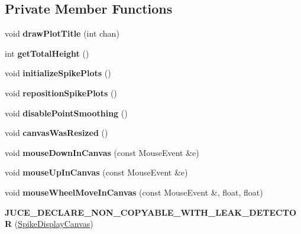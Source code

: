 \subsection*{Private Member Functions}
\begin{DoxyCompactItemize}
\item 
\hypertarget{classSpikeDisplayCanvas_a3f76b2964975da294b23d022eb14f66c}{void {\bfseries draw\-Plot\-Title} (int chan)}\label{classSpikeDisplayCanvas_a3f76b2964975da294b23d022eb14f66c}

\item 
\hypertarget{classSpikeDisplayCanvas_a2c1380483afcb1a4d7f024945b038530}{int {\bfseries get\-Total\-Height} ()}\label{classSpikeDisplayCanvas_a2c1380483afcb1a4d7f024945b038530}

\item 
\hypertarget{classSpikeDisplayCanvas_a8933f0eced1508de89c63eb488f84b0c}{void {\bfseries initialize\-Spike\-Plots} ()}\label{classSpikeDisplayCanvas_a8933f0eced1508de89c63eb488f84b0c}

\item 
\hypertarget{classSpikeDisplayCanvas_a8d17a50458d16fa018db53a8ceae0f6c}{void {\bfseries reposition\-Spike\-Plots} ()}\label{classSpikeDisplayCanvas_a8d17a50458d16fa018db53a8ceae0f6c}

\item 
\hypertarget{classSpikeDisplayCanvas_ad35880491504d7bdb4c9c5ede90c1b54}{void {\bfseries disable\-Point\-Smoothing} ()}\label{classSpikeDisplayCanvas_ad35880491504d7bdb4c9c5ede90c1b54}

\item 
\hypertarget{classSpikeDisplayCanvas_acbae1c32b6f4b052a07e3000c2a3c4cf}{void {\bfseries canvas\-Was\-Resized} ()}\label{classSpikeDisplayCanvas_acbae1c32b6f4b052a07e3000c2a3c4cf}

\item 
\hypertarget{classSpikeDisplayCanvas_a270ac99c4cfc87ae1a3789e0a4a8089c}{void {\bfseries mouse\-Down\-In\-Canvas} (const Mouse\-Event \&e)}\label{classSpikeDisplayCanvas_a270ac99c4cfc87ae1a3789e0a4a8089c}

\item 
\hypertarget{classSpikeDisplayCanvas_abd36f6c6cd235882722fbae0acea21a8}{void {\bfseries mouse\-Up\-In\-Canvas} (const Mouse\-Event \&e)}\label{classSpikeDisplayCanvas_abd36f6c6cd235882722fbae0acea21a8}

\item 
\hypertarget{classSpikeDisplayCanvas_a01d354fbb21089779160e5b4bb0754e6}{void {\bfseries mouse\-Wheel\-Move\-In\-Canvas} (const Mouse\-Event \&, float, float)}\label{classSpikeDisplayCanvas_a01d354fbb21089779160e5b4bb0754e6}

\item 
\hypertarget{classSpikeDisplayCanvas_adae6fbac8cef7b6506d2208a72c0110a}{{\bfseries J\-U\-C\-E\-\_\-\-D\-E\-C\-L\-A\-R\-E\-\_\-\-N\-O\-N\-\_\-\-C\-O\-P\-Y\-A\-B\-L\-E\-\_\-\-W\-I\-T\-H\-\_\-\-L\-E\-A\-K\-\_\-\-D\-E\-T\-E\-C\-T\-O\-R} (\hyperlink{classSpikeDisplayCanvas}{Spike\-Display\-Canvas})}\label{classSpikeDisplayCanvas_adae6fbac8cef7b6506d2208a72c0110a}

\end{DoxyCompactItemize}
